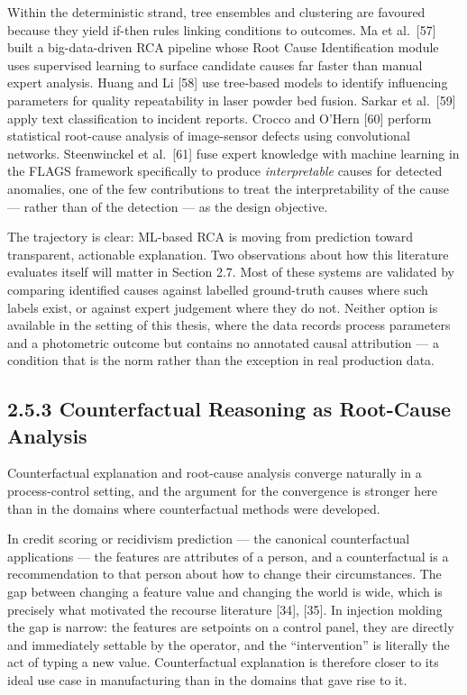 Within the deterministic strand, tree ensembles and clustering are favoured because they yield if-then rules linking conditions to outcomes. Ma et al.~{[}57{]} built a big-data-driven RCA pipeline whose Root Cause Identification module uses supervised learning to surface candidate causes far faster than manual expert analysis. Huang and Li {[}58{]} use tree-based models to identify influencing parameters for quality repeatability in laser powder bed fusion. Sarkar et al.~{[}59{]} apply text classification to incident reports. Crocco and O'Hern {[}60{]} perform statistical root-cause analysis of image-sensor defects using convolutional networks. Steenwinckel et al.~{[}61{]} fuse expert knowledge with machine learning in the FLAGS framework specifically to produce \emph{interpretable} causes for detected anomalies, one of the few contributions to treat the interpretability of the cause --- rather than of the detection --- as the design objective.

The trajectory is clear: ML-based RCA is moving from prediction toward transparent, actionable explanation. Two observations about how this literature evaluates itself will matter in Section 2.7. Most of these systems are validated by comparing identified causes against labelled ground-truth causes where such labels exist, or against expert judgement where they do not. Neither option is available in the setting of this thesis, where the data records process parameters and a photometric outcome but contains no annotated causal attribution --- a condition that is the norm rather than the exception in real production data.

\hypertarget{counterfactual-reasoning-as-root-cause-analysis}{%
\subsection{2.5.3 Counterfactual Reasoning as Root-Cause Analysis}\label{counterfactual-reasoning-as-root-cause-analysis}}

Counterfactual explanation and root-cause analysis converge naturally in a process-control setting, and the argument for the convergence is stronger here than in the domains where counterfactual methods were developed.

In credit scoring or recidivism prediction --- the canonical counterfactual applications --- the features are attributes of a person, and a counterfactual is a recommendation to that person about how to change their circumstances. The gap between changing a feature value and changing the world is wide, which is precisely what motivated the recourse literature {[}34{]}, {[}35{]}. In injection molding the gap is narrow: the features are setpoints on a control panel, they are directly and immediately settable by the operator, and the ``intervention'' is literally the act of typing a new value. Counterfactual explanation is therefore closer to its ideal use case in manufacturing than in the domains that gave rise to it.

